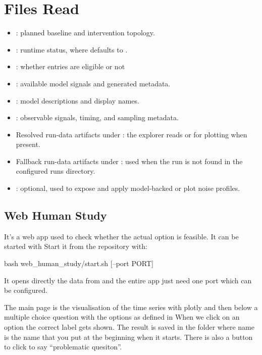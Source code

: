 \documentclass[11pt]{article}
\begin{document}
\section*{Files Read}

\begin{itemize}
\item {}: planned baseline and intervention topology.
\item {}: runtime status, where  defaults to .
\item {}: whether entries are eligible or not
\item {}: available model signals and generated metadata.
\item {}: model descriptions and display names.
\item {}: observable signals, timing, and sampling metadata.
\item Resolved run-data artifacts under : the explorer reads  or  for plotting when present.
\item Fallback run-data artifacts under : used when the run is not found in the configured runs directory.
\item {}: optional, used to expose and apply model-backed  or  plot noise profiles.
\end{itemize}


\subsection*{Web Human Study}
It's a web app used to check whether the actual option is feasible. 
It can be started with 
Start it from the repository with:
\begin{DocCode}
bash web_human_study/start.sh [--port PORT]
\end{DocCode}

It opens directly the data from  and the entire app just need one port which can be configured.

The main page is the visualisation of the time series with plotly and then below a multiple choice question with the options as defined in 
When we click on an option the correct label gets shown. The result is saved in the  folder where name is the name that you put at the beginning when it starts.
There is also a button to click to say ``problematic quesiton''. 
\end{document}
